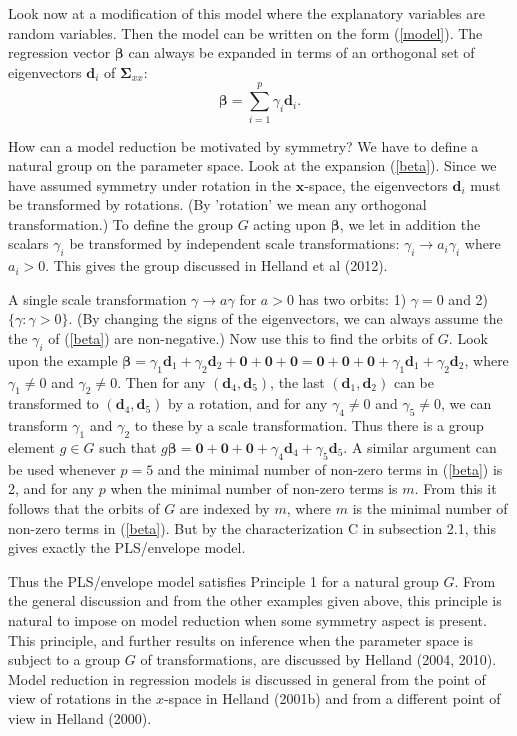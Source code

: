 \documentclass[11pt]{article}
\begin{document}
Look now at a modification of this model where the explanatory variables are random variables. Then the model can be written on the form (\ref{model}).  The regression vector 
$\bm{\beta}$ can always be expanded in terms of an orthogonal set of eigenvectors $\bm{d}_i$ of $\bm{\Sigma}_{xx}$:
\begin{equation}
\bm{\beta}=\sum_{i=1}^p \gamma_i \bm{d}_i .
\label{beta}
\end{equation}

How can a model reduction be motivated by symmetry? We have to define a natural group on the parameter space. Look at the expansion (\ref{beta}). Since we have assumed symmetry under rotation in the $\bm{x}$-space, the eigenvectors $\bm{d}_i$ must be transformed by rotations. (By 'rotation' we mean any orthogonal transformation.) To define the group $G$ acting upon $\bm{\beta}$, we let in addition the scalars $\gamma_i$ be transformed by independent scale transformations: $\gamma_i \rightarrow a_i \gamma_i$ where $a_i >0$. This gives the group discussed in Helland et al (2012).

A single scale transformation $\gamma\rightarrow a\gamma$ for $a>0$ has two orbits: 1) $\gamma=0$ and 2) $\{\gamma: \gamma>0\}$. (By changing the signs of the eigenvectors, we can always assume the the $\gamma_i$ of (\ref{beta}) are non-negative.) Now use this to find the orbits of $G$. Look upon the example $\bm{\beta}=\gamma_1\bm{d}_1+\gamma_2\bm{d}_2+\bm{0}+\bm{0}+\bm{0}=\bm{0}+\bm{0}+\bm{0}+\gamma_1\bm{d}_1
+\gamma_2\bm{d}_2$, where $\gamma_1\ne 0$ and $\gamma_2\ne 0$. Then for any $(\bm{d}_4,\bm{d}_5)$, the last  $(\bm{d}_1,\bm{d}_2)$ can be transformed to $(\bm{d}_4,\bm{d}_5)$ by a rotation, and for any $\gamma_4\ne 0$ and $\gamma_5\ne 0$, we can transform $\gamma_1$ and $\gamma_2$ to these by a scale transformation. Thus there is a group element $g\in G$ such that $g\bm{\beta}=\bm{0}+\bm{0}+\bm{0}+\gamma_4\bm{d}_4
+\gamma_5\bm{d}_5$. A similar argument can be used whenever $p=5$ and the minimal number of non-zero terms in (\ref{beta}) is 2, and for any $p$ when the minimal number of non-zero terms is $m$.  From this it follows that the orbits of $G$ are indexed by $m$, where $m$ is the minimal number of non-zero terms in (\ref{beta}). But by the characterization C in subsection 2.1, this gives exactly the PLS/envelope model.

Thus the PLS/envelope model satisfies Principle 1 for a natural group $G$. From the general discussion and from the other examples given above, this principle is natural to impose on model reduction when some symmetry aspect is present. This principle, and further results on inference when the parameter space is subject to a group $G$ of transformations, are discussed by Helland (2004, 2010). Model reduction in regression models is discussed in general from the point of view of rotations in the $x$-space in Helland (2001b) and from a different point of view in Helland (2000).
\end{document}

